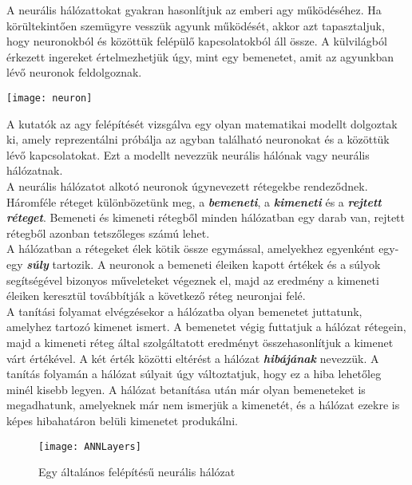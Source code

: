 
A neurális hálózattokat gyakran hasonlítjuk az emberi agy működéséhez. Ha körültekintően szemügyre vesszük agyunk működését, akkor azt tapasztaljuk, hogy neuronokból és közöttük felépülő kapcsolatokból áll össze. A külvilágból érkezett ingereket értelmezhetjük úgy, mint egy bemenetet, amit az agyunkban lévő neuronok feldolgoznak.\\

\begin{center}
	\texttt{[image: neuron]}
\end{center}

A kutatók az agy felépítését vizsgálva egy olyan matematikai modellt dolgoztak ki, amely   reprezentálni próbálja az agyban található neuronokat és a közöttük lévő kapcsolatokat. Ezt a modellt nevezzük neurális hálónak vagy neurális hálózatnak.\\

A neurális hálózatot alkotó neuronok úgynevezett rétegekbe rendeződnek. Háromféle réteget különbözetünk meg, a \textbf{\textit{bemeneti}}, a \textbf{\textit{kimeneti}} és a \textbf{\textit{rejtett réteget}}. Bemeneti és kimeneti rétegből minden hálózatban egy darab van, rejtett rétegből azonban tetszőleges számú lehet.\\

A hálózatban a rétegeket élek kötik össze egymással, amelyekhez egyenként egy-egy \textbf{\textit{súly}} tartozik. A neuronok a bemeneti éleiken kapott értékek és a súlyok segítségével bizonyos műveleteket végeznek el, majd az eredmény a kimeneti éleiken keresztül továbbítják a következő réteg neuronjai felé.\\

A tanítási folyamat elvégzésekor a hálózatba olyan bemenetet juttatunk, amelyhez tartozó kimenet ismert. A bemenetet végig futtatjuk a hálózat rétegein, majd a kimeneti réteg által szolgáltatott eredményt összehasonlítjuk a kimenet várt értékével. A két érték közötti eltérést a hálózat \textit{\textbf{hibájának}} nevezzük. A tanítás folyamán a hálózat súlyait úgy változtatjuk, hogy ez a hiba lehetőleg minél kisebb legyen. A hálózat betanítása után már olyan bemeneteket is megadhatunk, amelyeknek már nem ismerjük a kimenetét, és a hálózat ezekre is képes hibahatáron belüli kimenetet produkálni.

\begin{figure}
	\centering
	\texttt{[image: ANNLayers]}
	\caption{Egy általános felépítésű neurális hálózat}
\end{figure}

